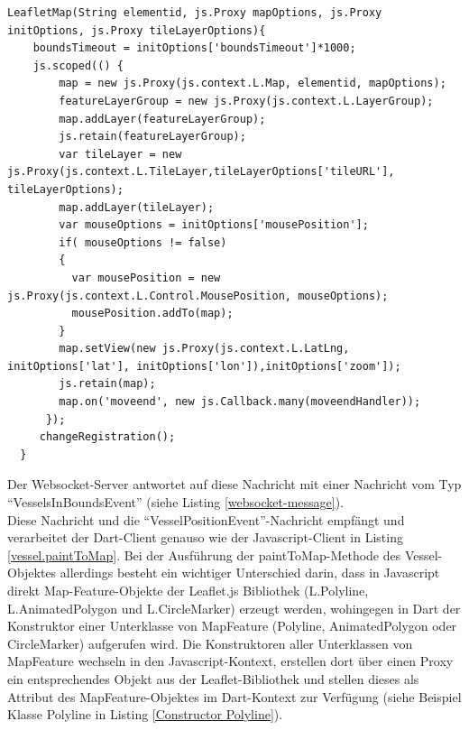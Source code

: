 \begin{lstlisting}[caption=Konstruktor des LeafletMap-Objektes mit Zugriff auf den Javascript-Kontext, label=LeafletMapConstructor]
LeafletMap(String elementid, js.Proxy mapOptions, js.Proxy initOptions, js.Proxy tileLayerOptions){
    boundsTimeout = initOptions['boundsTimeout']*1000;
    js.scoped(() {
        map = new js.Proxy(js.context.L.Map, elementid, mapOptions);
        featureLayerGroup = new js.Proxy(js.context.L.LayerGroup);
        map.addLayer(featureLayerGroup);
        js.retain(featureLayerGroup);
        var tileLayer = new js.Proxy(js.context.L.TileLayer,tileLayerOptions['tileURL'], tileLayerOptions);
        map.addLayer(tileLayer);
        var mouseOptions = initOptions['mousePosition'];
        if( mouseOptions != false)
        {
          var mousePosition = new js.Proxy(js.context.L.Control.MousePosition, mouseOptions);
          mousePosition.addTo(map);
        }
        map.setView(new js.Proxy(js.context.L.LatLng, initOptions['lat'], initOptions['lon']),initOptions['zoom']);
        js.retain(map);
        map.on('moveend', new js.Callback.many(moveendHandler));
      });
     changeRegistration();
  }
\end{lstlisting}
Der Websocket-Server antwortet auf diese Nachricht mit einer Nachricht vom Typ “VesselsInBoundsEvent” (siehe Listing \ref{websocket-message}).\\

Diese Nachricht und die “VesselPositionEvent”-Nachricht empfängt und verarbeitet der Dart-Client genauso wie der Javascript-Client in Listing \ref{vessel.paintToMap}. Bei der Ausführung der paintToMap-Methode des Vessel-Objektes allerdings besteht ein wichtiger Unterschied darin, dass in Javascript direkt Map-Feature-Objekte der Leaflet.js Bibliothek (L.Polyline, L.AnimatedPolygon und L.CircleMarker) erzeugt werden, wohingegen in Dart der Konstruktor einer Unterklasse von MapFeature (Polyline, AnimatedPolygon oder CircleMarker) aufgerufen wird. Die Konstruktoren aller Unterklassen von MapFeature wechseln in den Javascript-Kontext, erstellen dort über einen Proxy ein entsprechendes Objekt aus der Leaflet-Bibliothek und stellen dieses als Attribut des MapFeature-Objektes im Dart-Kontext zur Verfügung (siehe Beispiel Klasse Polyline in Listing \ref{Constructor Polyline}).\\


